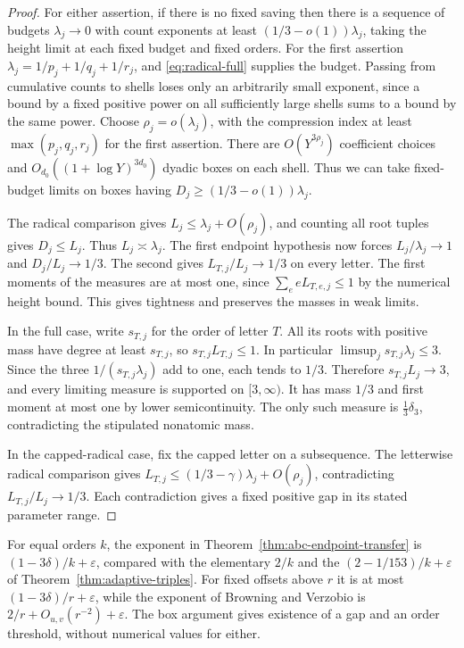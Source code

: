 \documentclass[11pt,reqno]{amsart}
\newcommand{\eps}{\varepsilon}
\begin{document}
\begin{proof}
For either assertion, if there is no fixed saving then there is
a sequence of budgets \(\lambda_j\to0\) with count exponents at
least \((1/3-o(1))\lambda_j\), taking the height limit at each
fixed budget and fixed orders. For the first assertion
\(\lambda_j=1/p_j+1/q_j+1/r_j\), and
\eqref{eq:radical-full} supplies the budget. Passing from cumulative
counts to shells loses only an arbitrarily small exponent, since
a bound by a fixed positive power on all sufficiently large
shells sums to a bound by the same power. Choose
\(\rho_j=o(\lambda_j)\), with the compression index at least
\(\max(p_j,q_j,r_j)\) for the first assertion. There are
\(O(Y^{3\rho_j})\) coefficient choices and
\(O_{d_0}((1+\log Y)^{3d_0})\) dyadic boxes on each shell. Thus we
can take fixed-budget limits on boxes having
\(D_j\ge(1/3-o(1))\lambda_j\).

The radical comparison gives \(L_j\le\lambda_j+O(\rho_j)\), and
counting all root tuples gives \(D_j\le L_j\). Thus \(L_j\asymp\lambda_j\).
The first endpoint hypothesis now forces \(L_j/\lambda_j\to1\)
and \(D_j/L_j\to1/3\). The second gives
\(L_{T,j}/L_j\to1/3\) on every letter. The first moments of the
measures are at most one, since
\(\sum_e e L_{T,e,j}\le1\) by the numerical height bound.
This gives tightness and preserves the masses in weak limits.

In the full case, write \(s_{T,j}\) for the order of letter \(T\).
All its roots with positive mass have degree at least \(s_{T,j}\),
so \(s_{T,j} L_{T,j}\le1\). In particular
\(\limsup_j s_{T,j}\lambda_j\le3\). Since the three
\(1/(s_{T,j}\lambda_j)\) add to one, each tends to \(1/3\).
Therefore \(s_{T,j}L_j\to3\), and every limiting measure is
supported on \([3,\infty)\). It has mass \(1/3\) and first
moment at most one by lower semicontinuity. The only such
measure is \(\frac13\delta_3\), contradicting the stipulated
nonatomic mass.

In the capped-radical case, fix the capped letter on a subsequence.
The letterwise radical comparison gives
\(L_{T,j}\le(1/3-\gamma)\lambda_j+O(\rho_j)\), contradicting
\(L_{T,j}/L_j\to1/3\). Each contradiction gives a fixed
positive gap in its stated parameter range.
\end{proof}

For equal orders \(k\), the exponent in
Theorem~\ref{thm:abc-endpoint-transfer} is
\((1-3\delta)/k+\eps\), compared with the elementary \(2/k\)
and the \((2-1/153)/k+\eps\) of
Theorem~\ref{thm:adaptive-triples}. For fixed offsets above \(r\)
it is at most \((1-3\delta)/r+\eps\), while the exponent of
Browning and Verzobio \cite[Theorem~1.1]{BV} is
\(2/r+O_{u,v}(r^{-2})+\eps\).
The box argument gives existence of a gap and an order
threshold, without numerical values for either.
\end{document}
